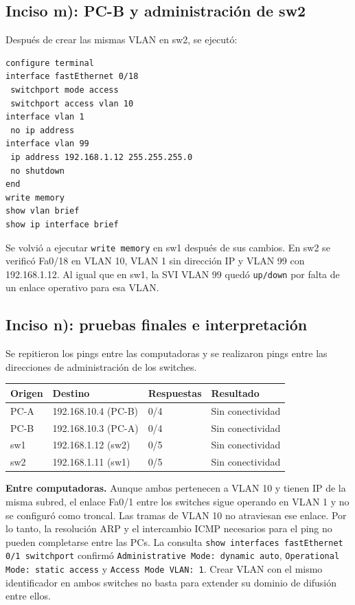 \documentclass[12pt,a4paper]{article}
\begin{document}
\subsection{Inciso m): PC-B y administración de sw2}
Después de crear las mismas VLAN en sw2, se ejecutó:
\begin{verbatim}
configure terminal
interface fastEthernet 0/18
 switchport mode access
 switchport access vlan 10
interface vlan 1
 no ip address
interface vlan 99
 ip address 192.168.1.12 255.255.255.0
 no shutdown
end
write memory
show vlan brief
show ip interface brief
\end{verbatim}
Se volvió a ejecutar \texttt{write memory} en sw1 después de sus cambios.
En sw2 se verificó Fa0/18 en VLAN 10, VLAN 1 sin dirección IP y VLAN 99
con 192.168.1.12. Al igual que en sw1, la SVI VLAN 99 quedó
\texttt{up/down} por falta de un enlace operativo para esa VLAN.

\subsection{Inciso n): pruebas finales e interpretación}
Se repitieron los pings entre las computadoras y se realizaron pings
entre las direcciones de administración de los switches.
\begin{center}
\small
\begin{tabular}{@{}llll@{}}
\toprule
Origen & Destino & Respuestas & Resultado \\
\midrule
PC-A & 192.168.10.4 (PC-B) & 0/4 & Sin conectividad \\
PC-B & 192.168.10.3 (PC-A) & 0/4 & Sin conectividad \\
sw1 & 192.168.1.12 (sw2) & 0/5 & Sin conectividad \\
sw2 & 192.168.1.11 (sw1) & 0/5 & Sin conectividad \\
\bottomrule
\end{tabular}
\end{center}

\textbf{Entre computadoras.} Aunque ambas pertenecen a VLAN 10 y tienen
IP de la misma subred, el enlace Fa0/1 entre los switches sigue operando
en VLAN 1 y no se configuró como troncal. Las tramas de VLAN 10 no
atraviesan ese enlace. Por lo tanto, la resolución ARP y el intercambio
ICMP necesarios para el ping no pueden completarse entre las PCs.
La consulta \texttt{show interfaces fastEthernet 0/1 switchport} confirmó \texttt{Administrative Mode: dynamic auto}, \texttt{Operational Mode: static access} y \texttt{Access Mode VLAN: 1}. Crear VLAN con el mismo identificador en ambos switches no basta para
extender su dominio de difusión entre ellos.
\end{document}
